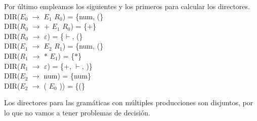 \documentclass[\main/ApuntesPL.tex]{subfiles}
\begin{document}
      \par
      Por último empleamos los siguientes y los primeros para calcular los directores.\\
      \hspace{5mm}DIR($E_0$ $\rightarrow$ $E_1$ $R_0$) = \{num, (\}\\
      \hspace{5mm}DIR($R_0$ $\rightarrow$ + $E_1$ $R_0$) = \{+\}\\
      \hspace{5mm}DIR($R_0$ $\rightarrow$ $\varepsilon$) = \{$\vdash$, (\}\\
      \hspace{5mm}DIR($E_1$ $\rightarrow$ $E_2$ $R_1$) = \{num, (\}\\
      \hspace{5mm}DIR($R_1$ $\rightarrow$ $\ast$ $E_1$) = \{$\ast$\}\\
      \hspace{5mm}DIR($R_1$ $\rightarrow$ $\varepsilon$) = \{+, $\vdash$, )\}\\
      \hspace{5mm}DIR($E_2$ $\rightarrow$ num) = \{num\}\\
      \hspace{5mm}DIR($E_2$ $\rightarrow$ ( $E_0$ )) = \{(\}\\

      \bigskip
      \par
      Los directores para las gramáticas con múltiples producciones son disjuntos, por lo que
      no vamos a tener problemas de decisión.
\end{document}
